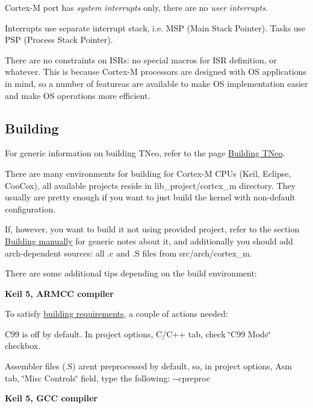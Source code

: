 Cortex-\/M port has {\itshape system interrupts} only, there are no {\itshape user interrupts}.

Interrupts use separate interrupt stack, i.\+e. M\+SP (Main Stack Pointer). Tasks use P\+SP (Process Stack Pointer).

There are no constraints on I\+S\+Rs\+: no special macros for I\+SR definition, or whatever. This is because Cortex-\/M processors are designed with OS applications in mind, so a number of featureas are available to make OS implementation easier and make OS operations more efficient.\hypertarget{arch_specific_cortex_m_building}{}\subsection{Building}\label{arch_specific_cortex_m_building}
For generic information on building T\+Neo, refer to the page \hyperlink{building}{Building T\+Neo}.

There are many environments for building for Cortex-\/M C\+P\+Us (Keil, Eclipse, Coo\+Cox), all available projects reside in {\ttfamily lib\+\_\+project/cortex\+\_\+m} directory. They usually are pretty enough if you want to just build the kernel with non-\/default configuration.

If, however, you want to build it not using provided project, refer to the section \hyperlink{building_building_generic__manual}{Building manually} for generic notes about it, and additionally you should add arch-\/dependent sources\+: all {\ttfamily .c} and {\ttfamily .S} files from {\ttfamily src/arch/cortex\+\_\+m}.

There are some additional tips depending on the build environment\+:

{\bfseries Keil 5, A\+R\+M\+CC compiler}

To satisfy \hyperlink{building_building_generic__manual}{building requirements}, a couple of actions needed\+:


\begin{DoxyItemize}
\item C99 is off by default. In project options, C/\+C++ tab, check \char`\"{}\+C99 Mode\char`\"{} checkbox.
\item Assembler files ({\ttfamily .S}) aren\textquotesingle{}t preprocessed by default, so, in project options, Asm tab, \char`\"{}\+Misc Controls\char`\"{} field, type the following\+: {\ttfamily -\/-\/cpreproc}
\end{DoxyItemize}

{\bfseries Keil 5, G\+CC compiler}

